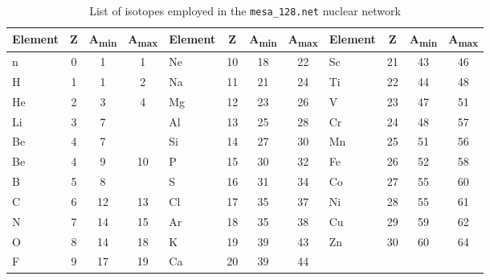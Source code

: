 \begin{table}[h!]
    \centering
    \begin{tabular}{>{\raggedright\arraybackslash}p{1.5cm} c c c | >{\raggedright\arraybackslash}p{1.5cm} c c c | >{\raggedright\arraybackslash}p{1.5cm} c c c}
        \hline\hline
        \textbf{Element} & \textbf{Z} & \textbf{A\textsubscript{min}} & \textbf{A\textsubscript{max}} & \textbf{Element} & \textbf{Z} & \textbf{A\textsubscript{min}} & \textbf{A\textsubscript{max}} & \textbf{Element} & \textbf{Z} & \textbf{A\textsubscript{min}} & \textbf{A\textsubscript{max}} \\
        \hline
        n & 0 & 1 & 1 & Ne & 10 & 18 & 22 & Sc & 21 & 43 & 46  \\
        H & 1 & 1 & 2 & Na & 11 & 21 & 24 & Ti & 22 & 44 & 48 \\
        He & 2 & 3 & 4 & Mg & 12 & 23 & 26 & V & 23 & 47 & 51 \\
        Li & 3 & 7 &  & Al & 13 & 25 & 28  & Cr & 24 & 48 & 57 \\
        Be & 4 & 7 & & Si & 14 & 27 & 30 & Mn & 25 & 51 & 56  \\
        Be & 4 & 9 & 10 & P & 15 & 30 & 32 & Fe & 26 & 52 & 58 \\
        B & 5 & 8 & & S & 16 & 31 & 34 & Co & 27 & 55 & 60 \\
        C & 6 & 12 & 13 & Cl & 17 & 35 & 37 & Ni & 28 & 55 & 61  \\
        N & 7 & 14 & 15 & Ar & 18 & 35 & 38 & Cu & 29 & 59 & 62 \\
        O & 8 & 14 & 18 & K & 19 & 39 & 43 & Zn & 30 & 60 & 64 \\
        F & 9 & 17 & 19 & Ca & 20 & 39 & 44 & & & & \\
        \hline
    \end{tabular}
    \caption{List of isotopes employed in the \texttt{mesa\_128.net} nuclear network }
    \label{tab:m128}
\end{table}


